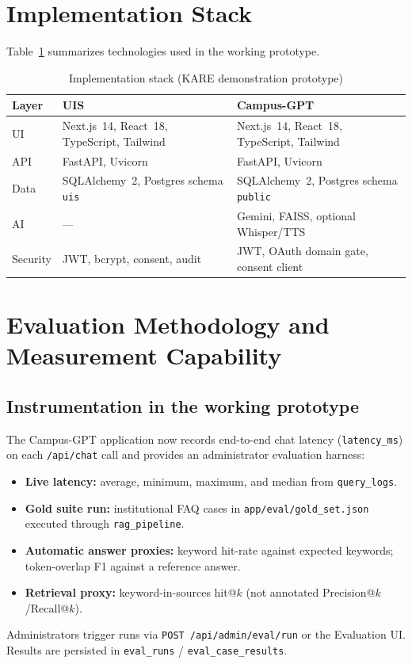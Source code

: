 \documentclass[conference]{IEEEtran}
\begin{document}
\section{Implementation Stack}
Table~\ref{tab:stack} summarizes technologies used in the working prototype.

\begin{table}[!t]
\renewcommand{\arraystretch}{1.12}
\caption{Implementation stack (KARE demonstration prototype)}
\label{tab:stack}
\centering
\begin{tabular}{p{}p{}p{}}
\toprule
\textbf{Layer} & \textbf{UIS} & \textbf{Campus-GPT} \\
\midrule
UI & Next.js~14, React~18, TypeScript, Tailwind & Next.js~14, React~18, TypeScript, Tailwind \\
API & FastAPI, Uvicorn & FastAPI, Uvicorn \\
Data & SQLAlchemy~2, Postgres schema \texttt{uis} & SQLAlchemy~2, Postgres schema \texttt{public} \\
AI & --- & Gemini, FAISS, optional Whisper/TTS \\
Security & JWT, bcrypt, consent, audit & JWT, OAuth domain gate, consent client \\
\bottomrule
\end{tabular}
\end{table}

\section{Evaluation Methodology and Measurement Capability}
\subsection{Instrumentation in the working prototype}
The Campus-GPT application now records end-to-end chat latency (\texttt{latency\_ms}) on each \texttt{/api/chat} call and provides an administrator evaluation harness:
\begin{itemize}[leftmargin=*,itemsep=1pt]
  \item \textbf{Live latency:} average, minimum, maximum, and median from \texttt{query\_logs}.
  \item \textbf{Gold suite run:} institutional FAQ cases in \texttt{app/eval/gold\_set.json} executed through \texttt{rag\_pipeline}.
  \item \textbf{Automatic answer proxies:} keyword hit-rate against expected keywords; token-overlap F1 against a reference answer.
  \item \textbf{Retrieval proxy:} keyword-in-sources hit@$k$ (not annotated Precision@$k$/Recall@$k$).
\end{itemize}
Administrators trigger runs via \texttt{POST /api/admin/eval/run} or the Evaluation UI. Results are persisted in \texttt{eval\_runs} / \texttt{eval\_case\_results}.
\end{document}
